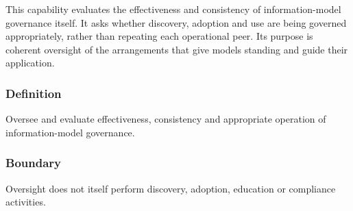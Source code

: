 This capability evaluates the effectiveness and consistency of information-model governance itself. It asks whether discovery, adoption and use are being governed appropriately, rather than repeating each operational peer. Its purpose is coherent oversight of the arrangements that give models standing and guide their application.

\subsubsection*{Definition}

Oversee and evaluate effectiveness, consistency and appropriate operation of information-model governance.

\subsubsection*{Boundary}

Oversight does not itself perform discovery, adoption, education or compliance activities.

